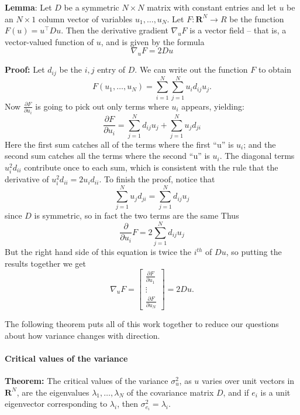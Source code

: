 \documentclass[]{article}
\let\oldparagraph\paragraph
\renewcommand{\paragraph}[1]{\oldparagraph{#1}\mbox{}}
\begin{document}
\textbf{Lemma}: Let \(D\) be a symmetric \(N\times N\) matrix with
constant entries and let \(u\) be an \(N\times 1\) column vector of
variables \(u_{1},\ldots, u_{N}\). Let \(F:\mathbf{R}^{N}\to R\) be the
function \(F(u) = u^{\intercal}Du\). Then the derivative gradient
\(\nabla_{u} F\) is a vector field -- that is, a vector-valued function
of \(u\), and is given by the formula \[
\nabla_{u} F = 2Du
\]

\textbf{Proof:} Let \(d_{ij}\) be the \(i,j\) entry of \(D\). We can
write out the function \(F\) to obtain \[
F(u_1,\ldots, u_{N}) = \sum_{i=1}^{N} \sum_{j=1}^{N} u_i d_{ij} u_j.
\] Now \(\frac{\partial F}{\partial u_{i}}\) is going to pick out only
terms where \(u_{i}\) appears, yielding: \[
\frac{\partial F}{\partial u_{i}} = \sum_{j=1}^{N} d_{ij}u_{j} + \sum_{j=1}^{N} u_{j}d_{ji}
\] Here the first sum catches all of the terms where the first ``u'' is
\(u_{i}\); and the second sum catches all the terms where the second
``u'' is \(u_{i}\). The diagonal terms \(u_{i}^2d_{ii}\) contribute once
to each sum, which is consistent with the rule that the derivative of
\(u_{i}^2d_{ii} = 2u_{i}d_{ii}\). To finish the proof, notice that \[
\sum_{j=1}^{N} u_{j}d_{ji} = \sum_{j=1}^{N} d_{ij}u_{j} 
\] since \(D\) is symmetric, so in fact the two terms are the same Thus
\[
\frac{\partial}{\partial u_{i}}F = 2\sum_{j=1}^{N} d_{ij}u_{j}
\] But the right hand side of this equation is twice the \(i^{th}\) of
\(Du\), so putting the results together we get \[
\nabla_{u}F = \left[\begin{matrix} \frac{\partial F}{\partial u_{1}} \\ \vdots \\ \frac{\partial F}{\partial u_{N}}\end{matrix}\right] = 2Du.
\]

The following theorem puts all of this work together to reduce our
questions about how variance changes with direction.

\hypertarget{sec:critvals}{%
\paragraph{Critical values of the variance}\label{sec:critvals}}

\textbf{Theorem:} The critical values of the variance \(\sigma_{u}^2\),
as \(u\) varies over unit vectors in \(\mathbf{R}^{N}\), are the
eigenvalues \(\lambda_{1},\ldots,\lambda_{N}\) of the covariance matrix
\(D\), and if \(e_{i}\) is a unit eigenvector corresponding to
\(\lambda_{i}\), then \(\sigma_{e_{i}}^2 = \lambda_{i}\).
\end{document}
